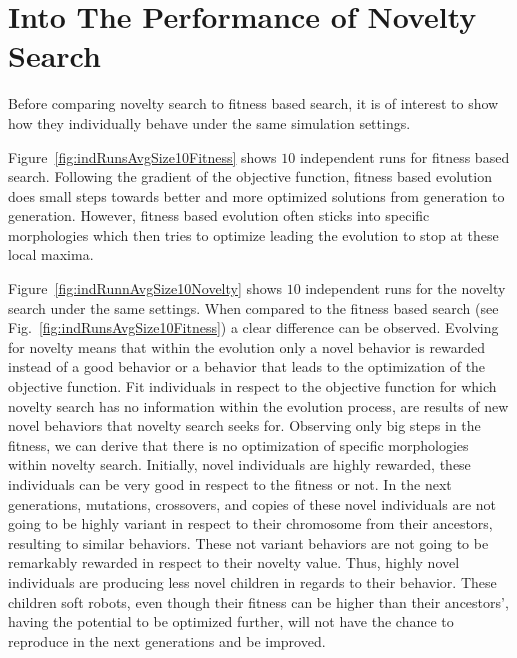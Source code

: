 \section{Into The Performance of Novelty Search}

Before comparing novelty search to fitness based search, it is of interest to show how they individually behave under the same simulation settings.

Figure~\ref{fig:indRunsAvgSize10Fitness} shows $10$ independent runs for fitness based search. Following the gradient of the objective function, fitness based evolution does small steps towards better and more optimized solutions from generation to generation. However, fitness based evolution often sticks into specific morphologies which then tries to optimize leading the evolution to stop at these local maxima.

Figure~\ref{fig:indRunnAvgSize10Novelty} shows $10$ independent runs for the novelty search under the same settings. When compared to the fitness based search (see Fig.~\ref{fig:indRunsAvgSize10Fitness}) a clear difference can be observed. Evolving for novelty means that within the evolution only a novel behavior is rewarded instead of a good behavior or a behavior that leads to the optimization of the objective function. Fit individuals in respect to the objective function for which novelty search has no information within the evolution process, are results of new novel behaviors that novelty search seeks for. Observing only big steps in the fitness, we can derive that there is no optimization of specific morphologies within novelty search. Initially, novel individuals are highly rewarded, these individuals can be very good in respect to the fitness or not. In the next generations, mutations, crossovers, and copies of these novel individuals are not going to be highly variant in respect to their chromosome from their ancestors, resulting to similar behaviors. These not variant behaviors are not going to be remarkably rewarded in respect to their novelty value. Thus, highly novel individuals are producing less novel children in regards to their behavior. These children soft robots, even though their fitness can be higher than their ancestors', having the potential to be optimized further, will not have the chance to reproduce in the next generations and be improved. 

